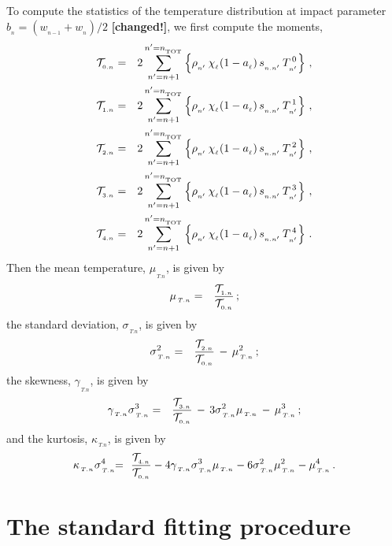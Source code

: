 \documentclass[usenatbib]{mn2e}
\numberwithin{equation}{section}
\begin{document}
To compute the statistics of the temperature distribution at impact parameter $b_{_n}=(w_{_{n-1}}+w_{_n})/2$ {\bf [changed!]}, we first compute the moments,
\begin{eqnarray}
{\cal T}_{_{0.n}}&=&2\sum\limits_{n'=n+1}^{n'=n_{_{\rm TOT}}}\left\{\rho_{_{n'}}\,\chi_{_\ell}(1-a_{_\ell})\,s_{_{n.n'}}\,T_{_{n'}}^{\,0}\right\}\,,\\
{\cal T}_{_{1.n}}&=&2\sum\limits_{n'=n+1}^{n'=n_{_{\rm TOT}}}\left\{\rho_{_{n'}}\,\chi_{_\ell}(1-a_{_\ell})\,s_{_{n.n'}}\,T_{_{n'}}^{\,1}\right\}\,,\\
{\cal T}_{_{2.n}}&=&2\sum\limits_{n'=n+1}^{n'=n_{_{\rm TOT}}}\left\{\rho_{_{n'}}\,\chi_{_\ell}(1-a_{_\ell})\,s_{_{n.n'}}\,T_{_{n'}}^{\,2}\right\}\,,\\
{\cal T}_{_{3.n}}&=&2\sum\limits_{n'=n+1}^{n'=n_{_{\rm TOT}}}\left\{\rho_{_{n'}}\,\chi_{_\ell}(1-a_{_\ell})\,s_{_{n.n'}}\,T_{_{n'}}^{\,3}\right\}\,,\\
{\cal T}_{_{4.n}}&=&2\sum\limits_{n'=n+1}^{n'=n_{_{\rm TOT}}}\left\{\rho_{_{n'}}\,\chi_{_\ell}(1-a_{_\ell})\,s_{_{n.n'}}\,T_{_{n'}}^{\,4}\right\}\,.
\end{eqnarray}
Then the mean temperature, $\mu_{_{\,T.n}}$, is given by
\begin{eqnarray}
\mu_{_{\,T.n}}&=&\frac{{\cal T}_{_{1.n}}}{{\cal T}_{_{0.n}}}\,;
\end{eqnarray}
the standard deviation, $\sigma_{_{\,T.n}}$, is given by
\begin{eqnarray}
\sigma_{_{\,T.n}}^2&=&\frac{{\cal T}_{_{2.n}}}{{\cal T}_{_{0.n}}}\,-\,\mu_{_{\,T.n}}^2\,;
\end{eqnarray}
the skewness, $\gamma_{_{\,T.n}}$, is given by
\begin{eqnarray}
\gamma_{_{\,T.n}}\sigma_{_{\,T.n}}^3&=&\frac{{\cal T}_{_{3.n}}}{{\cal T}_{_{0.n}}}\,-\,3\sigma_{_{\,T.n}}^2\mu_{_{\,T.n}}\,-\,\mu_{_{\,T.n}}^3\,;
\end{eqnarray}
and the kurtosis, $\kappa_{_{\,T.n}}$, is given by
\begin{eqnarray}\nonumber
\kappa_{_{\,T.n}}\sigma_{_{\,T.n}}^4\!&\!=\!&\!\frac{{\cal T}_{_{4.n}}}{{\cal T}_{_{0.n}}}-4\gamma_{_{\,T.n}}\sigma_{_{\,T.n}}^3\mu_{_{\,T.n}}-6\sigma_{_{\,T.n}}^2\mu_{_{\,T.n}}^2-\mu_{_{\,T.n}}^4\,.\\
\end{eqnarray}





\section{The standard fitting procedure}
\end{document}
